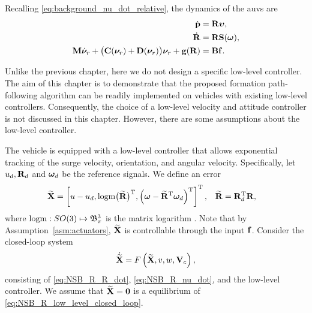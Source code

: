 Recalling \eqref{eq:background_nu_dot_relative}, the dynamics of the \glspl{auv} are
\begin{subequations}
\begin{align}
    \dot{\mat{p}} &= \mat{R} \bvel, \label{eq:NSB_R_p_dot}\\
    \dot{\mat{R}} &= \mat{R} \mat{S}(\bs{\omega}), \label{eq:NSB_R_R_dot} \\
    \mat{M} \dot{\vel}_r
        + \bigl(\mat{C}(\vel_r) + \mat{D}(\vel_r)\bigr) \vel_r + \mat{g}(\mat{R}) &= \mat{B}\mat{f}. \label{eq:NSB_R_nu_dot}
\end{align} \label{eq:NSB_R_matrix_vector_model}
\end{subequations}

Unlike the previous chapter, here we do not design a specific low-level controller.
The aim of this chapter is to demonstrate that the proposed formation path-following algorithm can be readily implemented on vehicles with existing low-level controllers.
Consequently, the choice of a low-level velocity and attitude controller is not discussed in this chapter.
However, there are some assumptions about the low-level controller.

\begin{asm}
    \label{ass5}
    The vehicle is equipped with a low-level controller that allows exponential tracking of the surge velocity, orientation, and angular velocity.
    Specifically, let $u_d, \mat{R}_d$ and $\bs{\omega}_d$ be the reference signals.
    We define an error 
    \begin{align}
        \widetilde{\mat{X}} &= \inlinevector{u - u_d, {\rm logm}\bigl(\widetilde{\mat{R}}\bigr)\T, \Bigl(\bs{\omega} - \widetilde{\mat{R}}\T\bs{\omega}_d\Bigr)\T}, &
        \widetilde{\mat{R}} &= \mat{R}_d\T\mat{R}, \label{eq:NSB_R_low_level_error}
    \end{align}
    where ${\rm logm} : SO(3) \mapsto \ball[3]{\pi}$ is the matrix logarithm \cite{iserles_lie_2000}.
    Note that by Assumption~\ref{asm:actuators}, $\widetilde{\mat{X}}$ is controllable through the input $\mat{f}$.
    Consider the closed-loop system 
    \begin{equation}
        \dot{\widetilde{\mat{X}}} = F \left( \widetilde{\mat{X}}, v, w, \ocean \right), \label{eq:NSB_R_low_level_closed_loop}
    \end{equation}
    consisting of \eqref{eq:NSB_R_R_dot}, \eqref{eq:NSB_R_nu_dot}, and the low-level controller.
    We assume that $\widetilde{\mat{X}} = \mat{0}$ is a  equilibrium of \eqref{eq:NSB_R_low_level_closed_loop}.
\end{asm}

